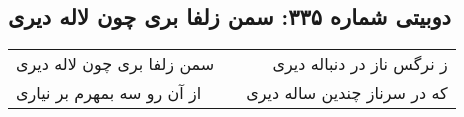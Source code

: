 \begin{center}
\section*{دوبیتی شماره ۳۳۵: سمن زلفا بری چون لاله دیری}
\label{sec:335}
\begin{longtable}{l p{0.5cm} r}
سمن زلفا بری چون لاله دیری
&&
ز نرگس ناز در دنباله دیری
\\
از آن رو سه بمهرم بر نیاری
&&
که در سرناز چندین ساله دیری
\\
\end{longtable}
\end{center}
